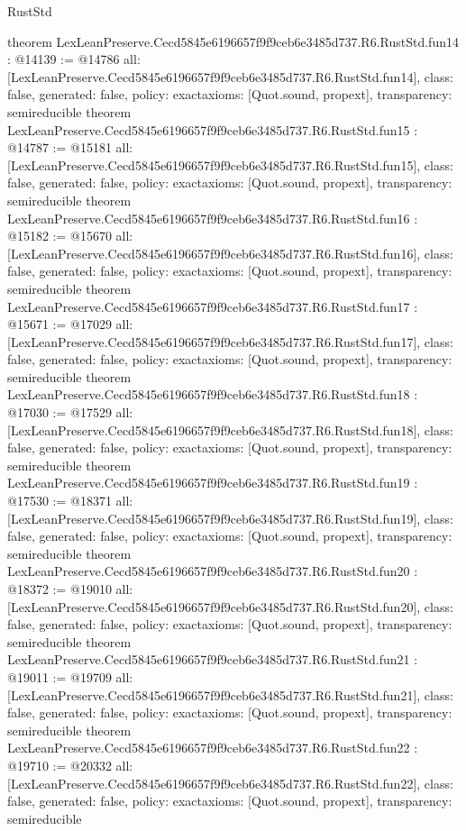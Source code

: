 \begin{lexlean}{RustStd}
\begin{coremodule}
{}
theorem LexLeanPreserve.Cecd5845e6196657f9f9ceb6e3485d737.R6.RustStd.fun14 : @14139 := @14786 {
  all: [LexLeanPreserve.Cecd5845e6196657f9f9ceb6e3485d737.R6.RustStd.fun14],
  class: false,
  generated: false,
  policy: exact{axioms: [Quot.sound, propext]},
  transparency: semireducible
}
theorem LexLeanPreserve.Cecd5845e6196657f9f9ceb6e3485d737.R6.RustStd.fun15 : @14787 := @15181 {
  all: [LexLeanPreserve.Cecd5845e6196657f9f9ceb6e3485d737.R6.RustStd.fun15],
  class: false,
  generated: false,
  policy: exact{axioms: [Quot.sound, propext]},
  transparency: semireducible
}
theorem LexLeanPreserve.Cecd5845e6196657f9f9ceb6e3485d737.R6.RustStd.fun16 : @15182 := @15670 {
  all: [LexLeanPreserve.Cecd5845e6196657f9f9ceb6e3485d737.R6.RustStd.fun16],
  class: false,
  generated: false,
  policy: exact{axioms: [Quot.sound, propext]},
  transparency: semireducible
}
theorem LexLeanPreserve.Cecd5845e6196657f9f9ceb6e3485d737.R6.RustStd.fun17 : @15671 := @17029 {
  all: [LexLeanPreserve.Cecd5845e6196657f9f9ceb6e3485d737.R6.RustStd.fun17],
  class: false,
  generated: false,
  policy: exact{axioms: [Quot.sound, propext]},
  transparency: semireducible
}
theorem LexLeanPreserve.Cecd5845e6196657f9f9ceb6e3485d737.R6.RustStd.fun18 : @17030 := @17529 {
  all: [LexLeanPreserve.Cecd5845e6196657f9f9ceb6e3485d737.R6.RustStd.fun18],
  class: false,
  generated: false,
  policy: exact{axioms: [Quot.sound, propext]},
  transparency: semireducible
}
theorem LexLeanPreserve.Cecd5845e6196657f9f9ceb6e3485d737.R6.RustStd.fun19 : @17530 := @18371 {
  all: [LexLeanPreserve.Cecd5845e6196657f9f9ceb6e3485d737.R6.RustStd.fun19],
  class: false,
  generated: false,
  policy: exact{axioms: [Quot.sound, propext]},
  transparency: semireducible
}
theorem LexLeanPreserve.Cecd5845e6196657f9f9ceb6e3485d737.R6.RustStd.fun20 : @18372 := @19010 {
  all: [LexLeanPreserve.Cecd5845e6196657f9f9ceb6e3485d737.R6.RustStd.fun20],
  class: false,
  generated: false,
  policy: exact{axioms: [Quot.sound, propext]},
  transparency: semireducible
}
theorem LexLeanPreserve.Cecd5845e6196657f9f9ceb6e3485d737.R6.RustStd.fun21 : @19011 := @19709 {
  all: [LexLeanPreserve.Cecd5845e6196657f9f9ceb6e3485d737.R6.RustStd.fun21],
  class: false,
  generated: false,
  policy: exact{axioms: [Quot.sound, propext]},
  transparency: semireducible
}
theorem LexLeanPreserve.Cecd5845e6196657f9f9ceb6e3485d737.R6.RustStd.fun22 : @19710 := @20332 {
  all: [LexLeanPreserve.Cecd5845e6196657f9f9ceb6e3485d737.R6.RustStd.fun22],
  class: false,
  generated: false,
  policy: exact{axioms: [Quot.sound, propext]},
  transparency: semireducible
}
\end{coremodule}
\end{lexlean}
